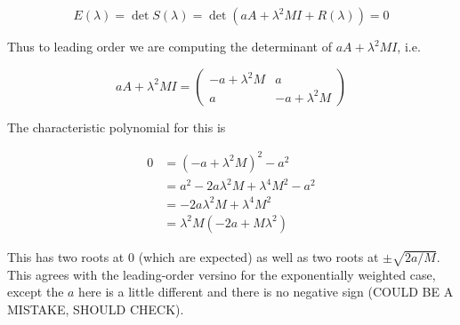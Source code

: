\documentclass[12pt]{article}
\begin{document}
\begin{enumerate}
\[
E(\lambda) = \det S(\lambda) = \det(a A + \lambda^2 MI + R(\lambda) ) = 0
\]

Thus to leading order we are computing the determinant of $a A + \lambda^2 MI$, i.e. 

\[
a A + \lambda^2 MI = 
\begin{pmatrix}
-a + \lambda^2 M & a \\
a & -a + \lambda^2 M
\end{pmatrix}
\]

The characteristic polynomial for this is

\begin{align*}
0 &= (-a + \lambda^2 M)^2 - a^2 \\
&= a^2 - 2 a \lambda^2 M + \lambda^4 M^2 - a^2 \\
&= - 2 a \lambda^2 M + \lambda^4 M^2 \\
&= \lambda^2 M (-2a + M \lambda^2 )
\end{align*}

This has two roots at 0 (which are expected) as well as two roots at $\pm \sqrt{2a/M}$. This agrees with the leading-order versino for the exponentially weighted case, except the $a$ here is a little different and there is no negative sign (COULD BE A MISTAKE, SHOULD CHECK).

\end{enumerate}
\end{document}
